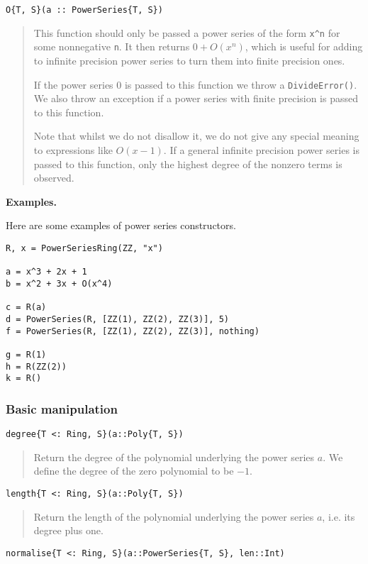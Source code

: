 \documentclass[a4paper,10pt]{article}
\newcommand{\code}{\lstinline}
\newcommand{\desc}[1]{\vspace{-3mm}\begin{quote}#1\end{quote}}
\begin{document}
{{{\begin{lstlisting}
O{T, S}(a :: PowerSeries{T, S})
\end{lstlisting}

\desc{This function should only be passed a power series of the form \code{x^n}
for some nonnegative \code{n}. It then returns $0 + O(x^n)$, which is useful
for adding to infinite precision power series to turn them into finite 
precision ones. 

If the power series $0$ is passed to this function we throw a 
\code{DivideError()}. We also throw an exception if a power series with finite
precision is passed to this function.

Note that whilst we do not disallow it, we do not give any special meaning to
expressions like $O(x - 1)$. If a general infinite precision power series is
passed to this function, only the highest degree of the nonzero terms is
observed.}

\textbf{Examples.}

Here are some examples of power series constructors.

\begin{lstlisting}
R, x = PowerSeriesRing(ZZ, "x")

a = x^3 + 2x + 1
b = x^2 + 3x + O(x^4)

c = R(a)
d = PowerSeries(R, [ZZ(1), ZZ(2), ZZ(3)], 5)
f = PowerSeries(R, [ZZ(1), ZZ(2), ZZ(3)], nothing)

g = R(1)
h = R(ZZ(2))
k = R()
\end{lstlisting}

\subsubsection{Basic manipulation}

\begin{lstlisting}
degree{T <: Ring, S}(a::Poly{T, S})
\end{lstlisting}

\desc{Return the degree of the polynomial underlying the power series $a$.
We define the degree of the zero polynomial to be $-1$.}

\begin{lstlisting}
length{T <: Ring, S}(a::Poly{T, S})
\end{lstlisting}

\desc{Return the length of the polynomial underlying the power series $a$, i.e.
its degree plus one.}

\begin{lstlisting}
normalise{T <: Ring, S}(a::PowerSeries{T, S}, len::Int)
\end{lstlisting}

}}}
\end{document}
